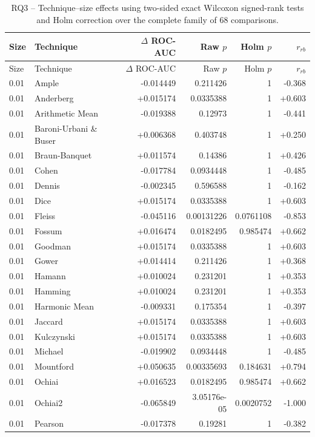\begin{longtable}{llrrrr}
\caption{RQ3 -- Technique--size effects using two-sided exact Wilcoxon signed-rank tests and Holm correction over the complete family of 68 comparisons.}\\
\toprule
Size & Technique & $\Delta$ ROC-AUC & Raw $p$ & Holm $p$ & $r_{rb}$ \\
\midrule
\endfirsthead
\toprule
Size & Technique & $\Delta$ ROC-AUC & Raw $p$ & Holm $p$ & $r_{rb}$ \\
\midrule
\endhead
0.01 & Ample & -0.014449 & 0.211426 & 1 & -0.368 \\
0.01 & Anderberg & +0.015174 & 0.0335388 & 1 & +0.603 \\
0.01 & Arithmetic Mean & -0.019388 & 0.12973 & 1 & -0.441 \\
0.01 & Baroni-Urbani \& Buser & +0.006368 & 0.403748 & 1 & +0.250 \\
0.01 & Braun-Banquet & +0.011574 & 0.14386 & 1 & +0.426 \\
0.01 & Cohen & -0.017784 & 0.0934448 & 1 & -0.485 \\
0.01 & Dennis & -0.002345 & 0.596588 & 1 & -0.162 \\
0.01 & Dice & +0.015174 & 0.0335388 & 1 & +0.603 \\
0.01 & Fleiss & -0.045116 & 0.00131226 & 0.0761108 & -0.853 \\
0.01 & Fossum & +0.016474 & 0.0182495 & 0.985474 & +0.662 \\
0.01 & Goodman & +0.015174 & 0.0335388 & 1 & +0.603 \\
0.01 & Gower & +0.014414 & 0.211426 & 1 & +0.368 \\
0.01 & Hamann & +0.010024 & 0.231201 & 1 & +0.353 \\
0.01 & Hamming & +0.010024 & 0.231201 & 1 & +0.353 \\
0.01 & Harmonic Mean & -0.009331 & 0.175354 & 1 & -0.397 \\
0.01 & Jaccard & +0.015174 & 0.0335388 & 1 & +0.603 \\
0.01 & Kulczynski & +0.015174 & 0.0335388 & 1 & +0.603 \\
0.01 & Michael & -0.019902 & 0.0934448 & 1 & -0.485 \\
0.01 & Mountford & +0.050635 & 0.00335693 & 0.184631 & +0.794 \\
0.01 & Ochiai & +0.016523 & 0.0182495 & 0.985474 & +0.662 \\
0.01 & Ochiai2 & -0.065849 & 3.05176e-05 & 0.0020752 & -1.000 \\
0.01 & Pearson & -0.017378 & 0.19281 & 1 & -0.382 \\

\end{longtable}
